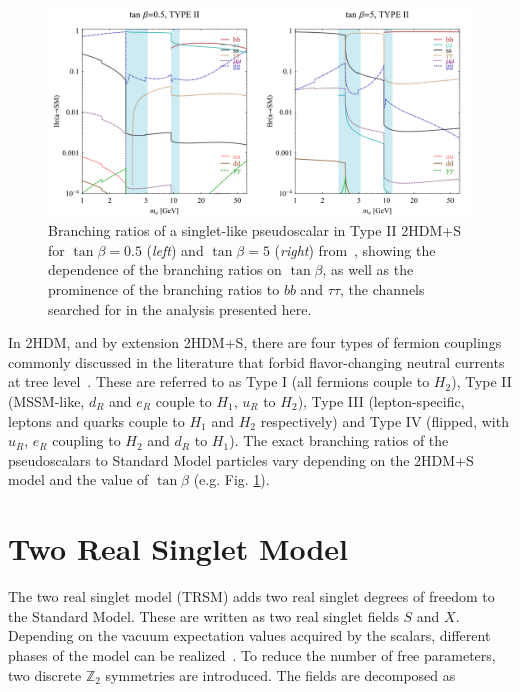 \begin{figure}[ht]
    \centering
    \includegraphics[width=14cm]{figures/ch-1-introduction/curtin-2014-figure-7-BRs-of-singlelike-pseudoscalar-type-II.png}
    \caption[Branching ratios of a singlet-like pseudoscalar in Type II 2HDM+S for $\tan\beta = 0.5$ (left) and $\tan\beta = 5$ (right).]{Branching ratios of a singlet-like pseudoscalar in Type II 2HDM+S for $\tan\beta = 0.5$ (\textit{left}) and $\tan\beta = 5$ (\textit{right}) from~\cite{2HDM-PhysRevD.90.075004}, showing the dependence of the branching ratios on $\tan\beta$, as well as the prominence of the branching ratios to $bb$ and $\tau\tau$, the channels searched for in the analysis presented here.}
    \label{fig:curtin-2014-fig-4-typeI-BRs}
\end{figure}


In 2HDM, and by extension 2HDM+S, there are four types of fermion couplings commonly discussed in the literature that forbid flavor-changing neutral currents at tree level~\cite{2HDM-PhysRevD.90.075004}. These are referred to as Type I (all fermions couple to $H_2$), Type II (MSSM-like, $d_R$ and $e_R$ couple to $H_1$, $u_R$ to $H_2$), Type III (lepton-specific, leptons and quarks couple to $H_1$ and $H_2$ respectively) and Type IV (flipped, with $u_R$, $e_R$ coupling to $H_2$ and $d_R$ to $H_1$). The exact branching ratios of the pseudoscalars to Standard Model particles vary depending on the 2HDM+S model and the value of $\tan\beta$ (e.g. Fig. \ref{fig:curtin-2014-fig-4-typeI-BRs}).

\section{Two Real Singlet Model}
\label{section:theory-TRSM}
The two real singlet model (TRSM) adds two real singlet degrees of freedom to the Standard Model. These are written as two real singlet fields $S$ and $X$. Depending on the vacuum expectation values acquired by the scalars, different phases of the model can be realized~\cite{Robens:2019kga}. To reduce the number of free parameters, two discrete $\mathbb{Z}_2$ symmetries are introduced. The fields are decomposed as

